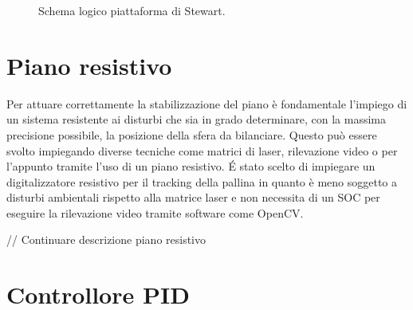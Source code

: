 \documentclass[11pt]{article}
\begin{document}
\begin{figure}[h!]
{
}
\caption{Schema logico piattaforma di Stewart.} \label{fig:ps}
\end{figure}


\section{Piano resistivo}\label{pianoresistivo}
Per attuare correttamente la stabilizzazione del piano è fondamentale l'impiego di un sistema resistente ai disturbi che sia in grado determinare, con la massima precisione possibile, la posizione della sfera da bilanciare. Questo può essere svolto impiegando diverse tecniche come matrici di laser, rilevazione video o per l'appunto tramite l'uso di un piano resistivo.
É stato scelto di impiegare un digitalizzatore resistivo per il tracking della pallina in quanto è meno soggetto a disturbi ambientali rispetto alla matrice laser e non necessita di un SOC per eseguire la rilevazione video tramite software come OpenCV.

// Continuare descrizione piano resistivo

\section{Controllore PID}\label{pid}
\end{document}
